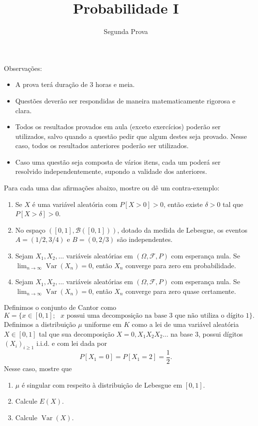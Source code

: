 \documentclass{article}
\newcommand*\1{\mathds{1}}
\DeclareMathOperator{\Var}{Var}
\begin{document}
\title{Probabilidade I}
\author{Segunda Prova}

\maketitle

\noindent Observa\c{c}\~oes:
\begin{itemize}
\item A prova terá duração de $3$ horas e meia.
\item Questões deverão ser respondidas de maneira matematicamente rigorosa e clara.
\item Todos os resultados provados em aula (exceto exercícios) poderão ser utilizados, salvo quando a questão pedir que algum destes seja provado. Nesse caso, todos os resultados anteriores poderão ser utilizados.
\item Caso uma questão seja composta de vários itens, cada um poderá ser resolvido independentemente, supondo a validade dos anteriores.
\end{itemize}

\vspace{4mm}
 Para cada uma das afirmações abaixo, mostre ou dê um contra-exemplo:
\begin{enumerate}[\quad a)]
\item Se $X$ é uma variável aleatória com $P[X > 0] > 0$, então existe $\delta > 0$ tal que $P[X > \delta] > 0$.
\item No espaço $([0, 1], \mathcal{B}([0, 1]))$, dotado da medida de Lebesgue, os eventos $A = (1/2, 3/4)$ e $B = (0, 2/3)$ são independentes.
\item Sejam $X_1, X_2, \dots$ variáveis aleatórias em $(\Omega, \mathcal{F}, P)$ com esperança nula. Se $\lim_{n \to \infty} \Var(X_n) = 0$, então $X_n$ converge para zero em probabilidade.
\item Sejam $X_1, X_2, \dots$ variáveis aleatórias em $(\Omega, \mathcal{F}, P)$ com esperança nula. Se $\lim_{n \to \infty} \Var(X_n) = 0$, então $X_n$ converge para zero quase certamente.
\end{enumerate}

\vspace{4mm}
 Definimos o conjunto de Cantor como
\begin{equation*}
  K = \big\{ x \in [0, 1]; \text{ $x$ possui uma decomposição na base $3$ que não utiliza o dígito $1$} \big\}.
\end{equation*}
Definimos a distribuição $\mu$ uniforme em $K$ como a lei de uma variável aleatória $X \in [0, 1]$ tal que sua decomposição $X = 0,X_1 X_2 X_2 \dots$ na base $3$, possui dígitos $(X_i)_{i \geq 1}$ i.i.d. e com lei dada por
\begin{equation*}
  P[X_1 = 0] = P[X_1 = 2] = \frac{1}{2}.
\end{equation*}
Nesse caso, mostre que
\begin{enumerate}[\quad a)]
\item $\mu$ é singular com respeito à distribuição de Lebesgue em $[0, 1]$.
\item Calcule $E(X)$.
\item Calcule $\Var(X)$.
\end{enumerate}
\end{document}
